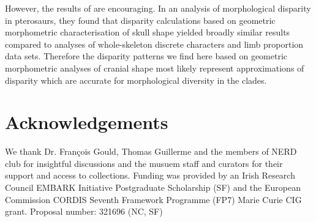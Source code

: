 \documentclass[12pt,a4paper]{article}
\begin{document}
However, the results of \citep{Foth2012} are encouraging. In an analysis of morphological disparity in pterosaurs, they found that disparity calculations based on geometric morphometric characterisation of skull shape yielded broadly similar results compared to analyses of whole-skeleton discrete characters and limb proportion data sets. Therefore the disparity patterns we find here based on geometric morphometric analyses of cranial shape most likely represent approximations of disparity which are accurate for morphological diversity in the clades. 












\section*{Acknowledgements}

We thank Dr. Fran\c{c}ois Gould, Thomas Guillerme and the members of NERD club for insightful discussions and the musuem staff and curators for their support and access to collections. Funding was provided by an Irish Research Council EMBARK Initiative Postgraduate Scholarship (SF) and the European Commission CORDIS Seventh Framework Programme (FP7) Marie Curie CIG grant. Proposal number: 321696 (NC, SF)
\end{document}
